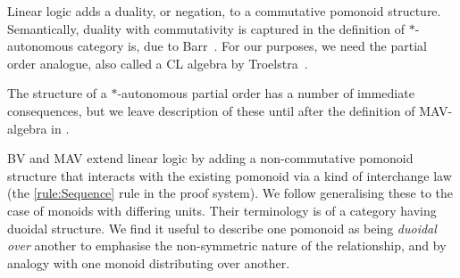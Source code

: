 
Linear logic adds a duality, or negation, to a commutative
pomonoid structure. Semantically, duality with commutativity is
captured in the definition of $*$-autonomous category is, due to Barr~\cite{Barr_1979}. For our purposes, we need the partial order
analogue, also called a CL algebra by Troelstra~\cite{Troelstra92:lll}.


\begin{remark}
  The structure of a $*$-autonomous partial order has a number of
  immediate consequences, but we leave description of these until
  after the definition of MAV-algebra in .
\end{remark}

BV and MAV extend linear logic by adding a non-commutative pomonoid
structure that interacts with the existing pomonoid via a kind of
interchange law (the \cref{rule:Sequence} rule in the proof
system). We follow \cite[Definition 6.1]{Aguiar_2010} generalising
these to the case of monoids with differing units. Their terminology
is of a category having duoidal structure. We find it useful to
describe one pomonoid as being \emph{duoidal over} another to
emphasise the non-symmetric nature of the relationship, and by analogy
with one monoid distributing over another.


